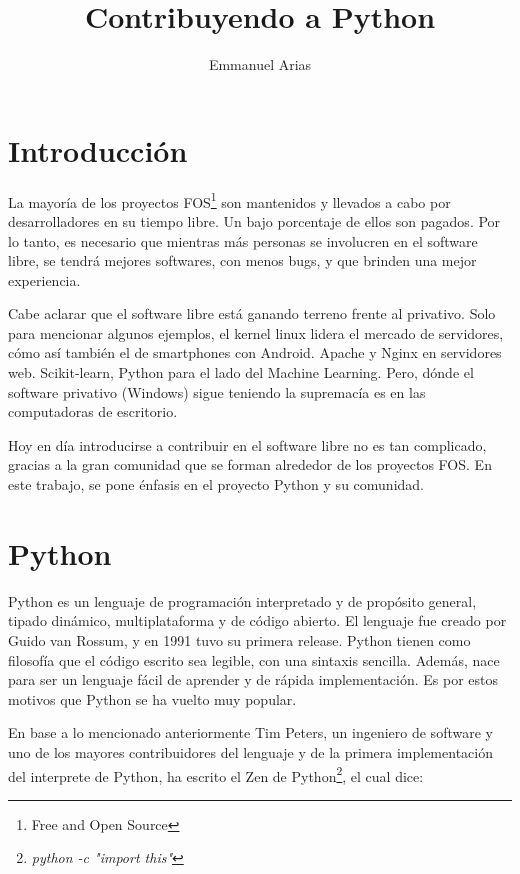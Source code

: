 \documentclass[12pt,a4paper,titlepage]{article}
\title{Contribuyendo a Python}
\author{Emmanuel Arias}
\begin{document}

\maketitle

\tableofcontents

\newpage

\section{Introducción}
La mayoría de los proyectos FOS\footnote{Free and Open Source} son mantenidos y llevados
a cabo por desarrolladores en su tiempo libre. Un bajo porcentaje
de ellos son pagados. Por lo tanto, es necesario que mientras más
personas se involucren en el software libre, se tendrá mejores
softwares, con menos bugs, y que brinden una mejor experiencia.

Cabe aclarar que el software libre está ganando terreno frente al
privativo. Solo para mencionar algunos ejemplos, el kernel linux
lidera el mercado de servidores, cómo así también el de smartphones
con Android. Apache y Nginx en servidores web. Scikit-learn, Python 
para el lado del Machine Learning. Pero, dónde el software privativo
(Windows) sigue teniendo la supremacía es en las computadoras 
de escritorio. 

Hoy en día introducirse a contribuir en el software libre no es
tan complicado, gracias a la gran comunidad que se forman alrededor
de los proyectos FOS. En este trabajo, se pone énfasis en el
proyecto Python y su comunidad. 

\section{Python}
Python es un lenguaje de programación interpretado y de propósito
general, tipado dinámico, multiplataforma y de código abierto.
El lenguaje fue creado por Guido van Rossum, y en 1991 tuvo
su primera release. Python tienen como filosofía que el código
escrito sea legible, con una sintaxis sencilla. Además, nace
para ser un lenguaje fácil de aprender y de rápida implementación. Es
por estos motivos que Python se ha vuelto muy popular.

En base a lo mencionado anteriormente Tim Peters, un ingeniero de 
software y uno de los mayores contribuidores del lenguaje y de la
primera implementación del interprete de Python, ha escrito
el Zen de Python\footnote{\textit{python -c "import this"}}, el cual dice:
\\
\end{document}
